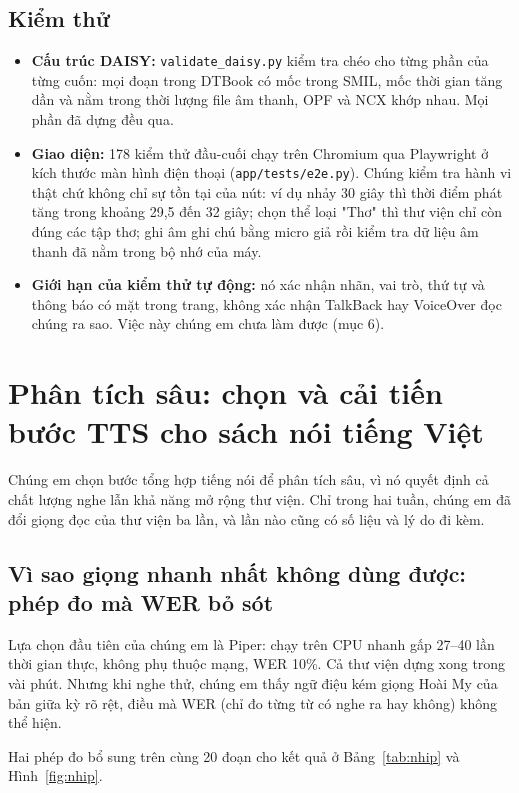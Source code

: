 \documentclass[12pt,a4paper]{article}
\providecommand{\tightlist}{\setlength{\itemsep}{2pt}\setlength{\parskip}{0pt}}
\begin{document}
\subsection{Kiểm thử}

\begin{itemize}
\tightlist
\item
  \textbf{Cấu trúc DAISY:} \texttt{validate\_daisy.py} kiểm tra chéo cho từng phần của từng cuốn: mọi đoạn trong DTBook có mốc trong SMIL, mốc thời gian tăng dần và nằm trong thời lượng file âm thanh, OPF và NCX khớp nhau. Mọi phần đã dựng đều qua.
\item
  \textbf{Giao diện:} 178 kiểm thử đầu-cuối chạy trên Chromium qua Playwright ở kích thước màn hình điện thoại (\texttt{app/tests/e2e.py}). Chúng kiểm tra hành vi thật chứ không chỉ sự tồn tại của nút: ví dụ nhảy 30 giây thì thời điểm phát tăng trong khoảng 29,5 đến 32 giây; chọn thể loại "Thơ" thì thư viện chỉ còn đúng các tập thơ; ghi âm ghi chú bằng micro giả rồi kiểm tra dữ liệu âm thanh đã nằm trong bộ nhớ của máy.
\item
  \textbf{Giới hạn của kiểm thử tự động:} nó xác nhận nhãn, vai trò, thứ tự và thông báo có mặt trong trang, không xác nhận TalkBack hay VoiceOver đọc chúng ra sao. Việc này chúng em chưa làm được (mục 6).
\end{itemize}

\section{Phân tích sâu: chọn và cải tiến bước TTS cho sách nói tiếng Việt}

Chúng em chọn bước tổng hợp tiếng nói để phân tích sâu, vì nó quyết định cả chất lượng nghe lẫn khả năng mở rộng thư viện. Chỉ trong hai tuần, chúng em đã đổi giọng đọc của thư viện ba lần, và lần nào cũng có số liệu và lý do đi kèm.

\subsection{Vì sao giọng nhanh nhất không dùng được: phép đo mà WER bỏ sót}

Lựa chọn đầu tiên của chúng em là Piper: chạy trên CPU nhanh gấp 27--40 lần thời gian thực, không phụ thuộc mạng, WER 10\%. Cả thư viện dựng xong trong vài phút. Nhưng khi nghe thử, chúng em thấy ngữ điệu kém giọng Hoài My của bản giữa kỳ rõ rệt, điều mà WER (chỉ đo từng từ có nghe ra hay không) không thể hiện.

Hai phép đo bổ sung trên cùng 20 đoạn cho kết quả ở Bảng~\ref{tab:nhip} và Hình~\ref{fig:nhip}.
\end{document}
